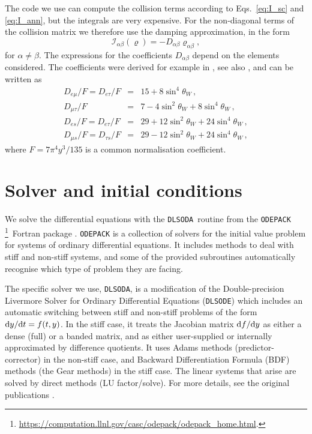 \documentclass[notitlepage,showpacs,preprintnumbers,amsmath,amssymb,superscriptaddress,prd,onecolumn]{revtex4-1}
\newcommand{\dlsoda}{\texttt{DLSODA}}
\begin{document}
The code we use can compute the collision terms according to Eqs.~\eqref{eq:I_sc} and \eqref{eq:I_ann},
but the integrals are very expensive.
For the non-diagonal terms of the collision matrix we therefore use the
damping approximation, in the form
%
\begin{equation}
\mathcal{I}_{\alpha\beta}(\varrho) = -D_{\alpha\beta} \varrho_{\alpha\beta},
\end{equation}
%
for $\alpha \neq \beta$.
The expressions for the coefficients $D_{\alpha\beta}$ depend on the elements considered.
The coefficients were derived for example in \cite{McKellar:1992ja},
see also \cite{Enqvist:1991qj,Bell:1998ds},
and can be written as
%
\begin{eqnarray}
D_{e\mu}/F=D_{e\tau}/F & = & 15 + 8\sin^4\theta_W\,,\\
D_{\mu\tau}/F & = & 7 - 4\sin^2\theta_W + 8\sin^4\theta_W\,,\\
D_{es}/F=D_{e\tau}/F & = & 29 + 12\sin^2\theta_W + 24\sin^4\theta_W\,,\\
D_{\mu s}/F = D_{\tau s}/F & = & 29 - 12\sin^2\theta_W + 24\sin^4\theta_W\,,
\end{eqnarray}
where
$F=7\pi^4 y^3/135$ is a common normalisation coefficient.


\section{Solver and initial conditions}
\label{ssec:solver}
We solve the differential equations with the \dlsoda\ routine
from the \texttt{ODEPACK}%
\footnote{\url{https://computation.llnl.gov/casc/odepack/odepack_home.html}.}\
Fortran package \cite{hindmarsh1982odepack,dlsoda1}.
\texttt{ODEPACK} is a collection of solvers for the initial value problem for systems of ordinary differential equations.
It includes methods to deal with stiff and non-stiff systems, and some of the provided subroutines
automatically recognise which type of problem they are facing.

The specific solver we use, \dlsoda,
is a modification of the Double-precision Livermore Solver for Ordinary Differential Equations (\texttt{DLSODE})
which includes an automatic switching between stiff and non-stiff problems
of the form ${\rm d}y/{\rm d}t = f(t,y)$.
In the stiff case, it treats the Jacobian matrix ${\rm d}f/{\rm d}y$ as either a dense (full) or a banded matrix, and as either user-supplied or internally approximated by difference quotients.
It uses Adams methods (predictor-corrector) in the non-stiff case, and Backward Differentiation Formula (BDF) methods (the Gear methods) in the stiff case.
The linear systems that arise are solved by direct methods (LU factor/solve).
For more details, see the original publications  \cite{hindmarsh1982odepack,dlsoda1}.
\end{document}
